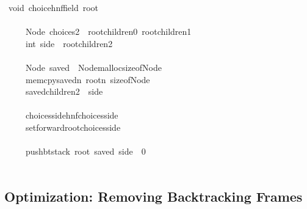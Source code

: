 \documentclass{book}
\theoremstyle{definition}
\begin{document}
{\begin{tabbing}\ttfamily
~void~choicehnffield~root\\
\ttfamily ~\\
\ttfamily ~~~~~Node~choices2~~rootchildren0~rootchildren1\\
\ttfamily ~~~~~int~side~~rootchildren2\\
\ttfamily ~\\
\ttfamily ~~~~~Node~saved~~NodemallocsizeofNode\\
\ttfamily ~~~~~memcpysavedn~rootn~sizeofNode\\
\ttfamily ~~~~~savedchildren2~~side\\
\ttfamily ~\\
\ttfamily ~~~~~choicessidehnfchoicesside\\
\ttfamily ~~~~~setforwardrootchoicesside\\
\ttfamily ~\\
\ttfamily ~~~~~pushbtstack~root~saved~side~~0\\
\ttfamily ~
\end{tabbing}

\subsection{Optimization: Removing Backtracking Frames}

}
\end{document}

